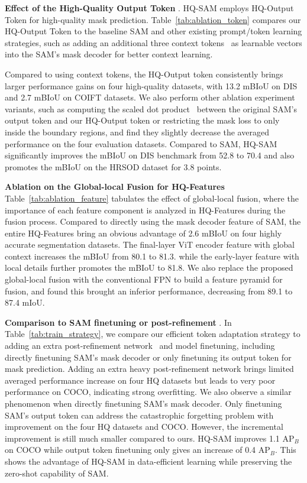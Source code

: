 \textbf{Effect of the High-Quality Output Token} . HQ-SAM employs HQ-Output Token for high-quality mask prediction. Table~\ref{tab:ablation_token} compares our HQ-Output Token to the baseline SAM and other existing prompt/token learning strategies, such as adding an additional three context tokens~\cite{zhou2022coop} as learnable vectors into the SAM's mask decoder for better context learning. 

Compared to using context tokens, the HQ-Output token consistently brings larger performance gains on four high-quality datasets, with 13.2 mBIoU on DIS and 2.7 mBIoU on COIFT datasets. We also perform other ablation experiment variants, such as computing the scaled dot product~\cite{jia2022visual} between the original SAM's output token and our HQ-Output token or restricting the mask loss to only inside the boundary regions, and find they slightly decrease the averaged performance on the four evaluation datasets. Compared to SAM, HQ-SAM significantly improves the mBIoU on DIS benchmark from 52.8 to 70.4 and also promotes the mBIoU on the HRSOD dataset for 3.8 points.

\textbf{Ablation on the Global-local Fusion for HQ-Features}  Table~\ref{tab:ablation_feature} tabulates the effect of global-local fusion, where the importance of each feature component is analyzed in HQ-Features during the fusion process. Compared to directly using the mask decoder feature of SAM, the entire HQ-Features bring an obvious advantage of 2.6 mBIoU on four highly accurate segmentation datasets. The final-layer ViT encoder feature with global context increases the mBIoU from 80.1 to 81.3. while the early-layer feature with local details further promotes the mBIoU to 81.8. We also replace the proposed global-local fusion with the conventional FPN to build a feature pyramid for fusion, and found this brought an inferior performance, decreasing from 89.1 to 87.4 mIoU.

\textbf{Comparison to SAM finetuning or post-refinement} . In Table~\ref{tab:train_strategy}, we compare our efficient token adaptation strategy to adding an extra post-refinement network~\cite{cascadepsp} and model finetuning, including directly finetuning SAM's mask decoder or only finetuning its output token for mask prediction. Adding an extra heavy post-refinement network brings limited averaged performance increase on four HQ datasets but leads to very poor performance on COCO, indicating strong overfitting. We also observe  a similar phenomenon when directly finetuning SAM's mask decoder. Only finetuning SAM's output token can address the catastrophic forgetting problem with improvement on the four HQ datasets and COCO. However, the incremental improvement is still much smaller compared to ours. HQ-SAM improves 1.1 AP$_B$ on COCO while output token finetuning only gives an increase of 0.4 AP$_B$. This shows the advantage of HQ-SAM in data-efficient learning while preserving the zero-shot capability of SAM.

